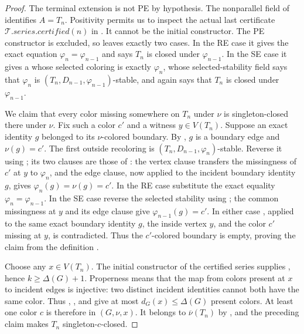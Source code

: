 \begin{proof}
The terminal extension is not PE by hypothesis.  The nonparallel field of
 identifies $A=T_n$.  Positivity permits us to
inspect the actual last certificate
$\mathcal T.\mathit{series.certified}(n)$ in
.  It cannot be the initial constructor.  The PE
constructor is excluded, so  leaves exactly
two cases.  In the RE case it gives the exact equation
$\varphi_n=\varphi_{n-1}$ and says $T_n$ is closed under
$\varphi_{n-1}$.  In the SE case it gives a
 whose selected coloring is exactly
$\varphi_n$, whose selected-stability field says that $\varphi_n$ is
$(T_n,D_{n-1},\varphi_{n-1})$-stable, and again says that $T_n$ is closed
under $\varphi_{n-1}$.

We claim that every color missing somewhere on $T_n$ under $\nu$ is
singleton-closed there under $\nu$.  Fix such a color $c'$ and a witness
$y\in V(T_n)$.  Suppose an exact identity $g$ belonged to its
$\nu$-colored boundary.  By , $g$ is a
boundary edge and $\nu(g)=c'$.  The first outside recoloring is
$(T_n,D_{n-1},\varphi_n)$-stable.  Reverse it using ; its
two clauses are those of : the vertex clause
transfers the missingness of $c'$ at $y$ to $\varphi_n$, and the edge
clause, now applied to the incident boundary identity $g$, gives
$\varphi_n(g)=\nu(g)=c'$.  In the RE case substitute the exact
equality $\varphi_n=\varphi_{n-1}$.  In the SE case reverse the selected
stability using ; the common missingness at $y$ and its edge
clause give $\varphi_{n-1}(g)=c'$.  In either case
, applied to the same exact boundary
identity $g$, the inside vertex $y$, and the color $c'$ missing at $y$,
is contradicted.  Thus the $c'$-colored boundary is empty, proving the
claim from the definition .

Choose any $x\in V(T_n)$.  The initial constructor of the certified
series supplies , hence $k\geq\Delta(G)+1$.  Properness
means that the map from colors present at $x$ to incident edges is
injective: two distinct incident identities cannot both have the same
color.  Thus , , and
 give at most $d_G(x)\leq\Delta(G)$ present
colors.  At least one color $c$ is therefore in
$(G,\nu,x)$.  It belongs to
$\overline\nu(T_n)$ by , and the preceding
claim makes $T_n$ singleton-$c$-closed.


\end{proof}
